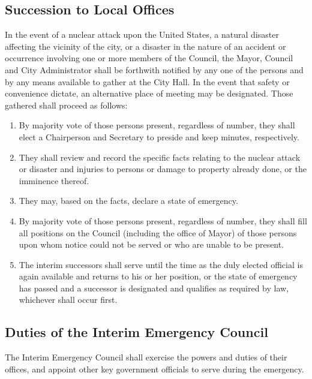 \subsection{Succession to Local Offices}
In the event of a nuclear attack upon the United States, a natural disaster affecting the vicinity of the city, or a disaster in the nature of an accident or occurrence involving one or more members of the Council, the Mayor, Council and City Administrator shall be forthwith notified by any one of the persons and by any means available to gather at the City Hall.  In the event that safety or convenience dictate, an alternative place of meeting may be designated.  Those gathered shall proceed as follows:
\begin{enumerate}[{\indent}1)]
    \item By majority vote of those persons present, regardless of number, they shall elect a Chairperson and Secretary to preside and keep minutes, respectively.
    \item They shall review and record the specific facts relating to the nuclear attack or disaster and injuries to persons or damage to property already done, or the imminence thereof.
    \item They may, based on the facts, declare a state of emergency.
    \item By majority vote of those persons present, regardless of number, they shall fill all positions on the Council (including the office of Mayor) of those persons upon whom notice could not be served or who are unable to be present.
    \item The interim successors shall serve until the time as the duly elected official is again available and returns to his or her position, or the state of emergency has passed and a successor is designated and qualifies as required by law, whichever shall occur first.
\end{enumerate}
\subsection{Duties of the Interim Emergency Council}
The Interim Emergency Council shall exercise the powers and duties of their offices, and appoint other key government officials to serve during the emergency.

